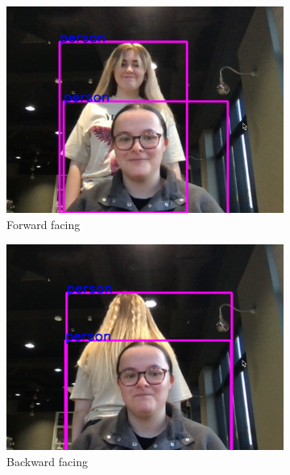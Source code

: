 \documentclass[12pt]{article}
\theoremstyle{plain}
\theoremstyle{definition}
\begin{document}
\begin{figure}[h!]
     \centering
     \begin{subfigure}[b]{0.3\textwidth}
         \centering
         \includegraphics[width=\textwidth]{img/fig1-img1.png}
         \caption{Forward facing}
         \label{fig:a}
     \end{subfigure}
     \hfill
     \begin{subfigure}[b]{0.3\textwidth}
         \centering
         \includegraphics[width=\textwidth]{img/fig1-img2.png}
         \caption{Backward facing}
         \label{fig:b}
     \end{subfigure}
     \hfill
     \begin{subfigure}[b]{0.3\textwidth}
         \centering

\end{subfigure}
\end{figure}
\end{document}
